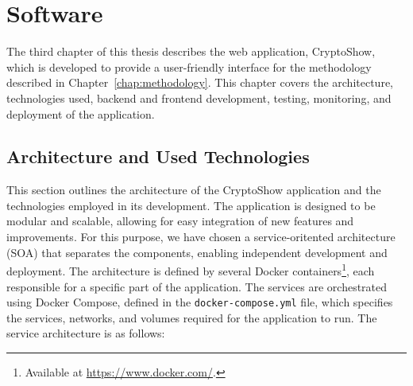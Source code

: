 \chapter{Software}
\label{chap:software}

The third chapter of this thesis describes the web application, CryptoShow, which is developed to provide a user-friendly interface for the methodology described in Chapter~\ref{chap:methodology}. This chapter covers the architecture, technologies used, backend and frontend development, testing, monitoring, and deployment of the application.

\section{Architecture and Used Technologies}
\label{sec:architecture-technologies}

This section outlines the architecture of the CryptoShow application and the technologies employed in its development. The application is designed to be modular and scalable, allowing for easy integration of new features and improvements. For this purpose, we have chosen a service-oritented architecture (SOA) that separates the components, enabling independent development and deployment. The architecture is defined by several Docker containers\footnote{Available at \url{https://www.docker.com/}.}, each responsible for a specific part of the application. The services are orchestrated using Docker Compose, defined in the \texttt{docker-compose.yml} file, which specifies the services, networks, and volumes required for the application to run. The service architecture is as follows:

